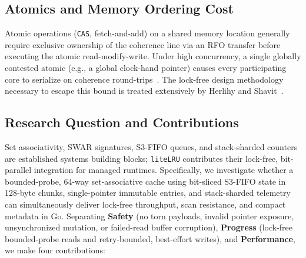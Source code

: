 \documentclass[11pt,a4paper]{article}
\begin{document}
\subsection{Atomics and Memory Ordering Cost}

Atomic operations (\texttt{CAS}, fetch-and-add) on a shared memory location generally require exclusive ownership of the coherence line via an RFO transfer before executing the atomic read-modify-write. Under high concurrency, a single globally contested atomic (e.g., a global clock-hand pointer) causes every participating core to serialize on coherence round-trips~\cite{dice,amdahl1967}. The lock-free design methodology necessary to escape this bound is treated extensively by Herlihy and Shavit~\cite{lockfree2004}.

\subsection{Research Question and Contributions}
Set associativity, SWAR signatures, S3-FIFO queues, and stack-sharded counters are established systems building blocks; \texttt{liteLRU} contributes their lock-free, bit-parallel integration for managed runtimes. Specifically, we investigate whether a bounded-probe, 64-way set-associative cache using bit-sliced S3-FIFO state in 128-byte chunks, single-pointer immutable entries, and stack-sharded telemetry can simultaneously deliver lock-free throughput, scan resistance, and compact metadata in Go. Separating \textbf{Safety} (no torn payloads, invalid pointer exposure, unsynchronized mutation, or failed-read buffer corruption), \textbf{Progress} (lock-free bounded-probe reads and retry-bounded, best-effort writes), and \textbf{Performance}, we make four contributions:
\end{document}

